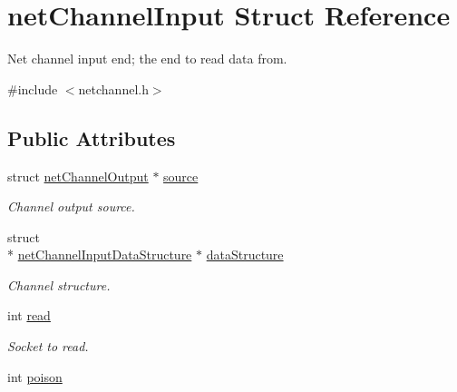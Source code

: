 \hypertarget{structnetChannelInput}{\section{net\-Channel\-Input Struct Reference}
\label{structnetChannelInput}
}


Net channel input end; the end to read data from.  




{\ttfamily \#include $<$netchannel.\-h$>$}

\subsection*{Public Attributes}
\begin{DoxyCompactItemize}
\item 
\hypertarget{structnetChannelInput_a83a5a72ba4dd59822aa28f8aad5925f1}{struct \hyperlink{structnetChannelOutput}{net\-Channel\-Output} $\ast$ \hyperlink{structnetChannelInput_a83a5a72ba4dd59822aa28f8aad5925f1}{source}}\label{structnetChannelInput_a83a5a72ba4dd59822aa28f8aad5925f1}

\begin{DoxyCompactList}\small\item\em Channel output source. \end{DoxyCompactList}\item 
\hypertarget{structnetChannelInput_add140dd42405457f4d1f88b74f381bd2}{struct \\*
\hyperlink{structnetChannelInputDataStructure}{net\-Channel\-Input\-Data\-Structure} $\ast$ \hyperlink{structnetChannelInput_add140dd42405457f4d1f88b74f381bd2}{data\-Structure}}\label{structnetChannelInput_add140dd42405457f4d1f88b74f381bd2}

\begin{DoxyCompactList}\small\item\em Channel structure. \end{DoxyCompactList}\item 
\hypertarget{structnetChannelInput_a5b161412f4617236b435ce567e82d453}{int \hyperlink{structnetChannelInput_a5b161412f4617236b435ce567e82d453}{read}}\label{structnetChannelInput_a5b161412f4617236b435ce567e82d453}

\begin{DoxyCompactList}\small\item\em Socket to read. \end{DoxyCompactList}\item 
\hypertarget{structnetChannelInput_a8b4f3f9497a9eececb55c1848cffd23d}{int \hyperlink{structnetChannelInput_a8b4f3f9497a9eececb55c1848cffd23d}{poison}}\label{structnetChannelInput_a8b4f3f9497a9eececb55c1848cffd23d}


\end{DoxyCompactItemize}
